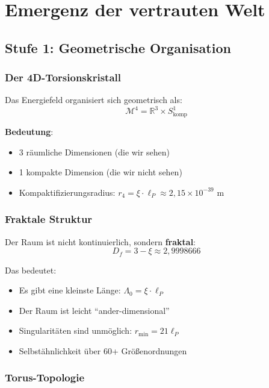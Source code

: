 	\section{Emergenz der vertrauten Welt}
	
	\subsection{Stufe 1: Geometrische Organisation}
	
	\subsubsection{Der 4D-Torsionskristall}
	
	Das Energiefeld organisiert sich geometrisch als:
	\begin{equation}
		\mathcal{M}^4 = \mathbb{R}^3 \times S^1_{\text{komp}}
	\end{equation}
	
	\textbf{Bedeutung}:
	\begin{itemize}
		\item 3 räumliche Dimensionen (die wir sehen)
		\item 1 kompakte Dimension (die wir nicht sehen)
		\item Kompaktifizierungsradius: $r_4 = \xi \cdot \ell_P \approx 2{,}15 \times 10^{-39}$ m
	\end{itemize}
	
	\subsubsection{Fraktale Struktur}
	
	Der Raum ist nicht kontinuierlich, sondern \textbf{fraktal}:
	\begin{equation}
		D_f = 3 - \xi \approx 2{,}9998666
	\end{equation}
	
	Das bedeutet:
	\begin{itemize}
		\item Es gibt eine kleinste Länge: $\Lambda_0 = \xi \cdot \ell_P$
		\item Der Raum ist leicht \enquote{ander-dimensional}
		\item Singularitäten sind unmöglich: $r_{\min} = 21\ell_P$
		\item Selbstähnlichkeit über 60+ Größenordnungen
	\end{itemize}
	
	\subsubsection{Torus-Topologie}
	
